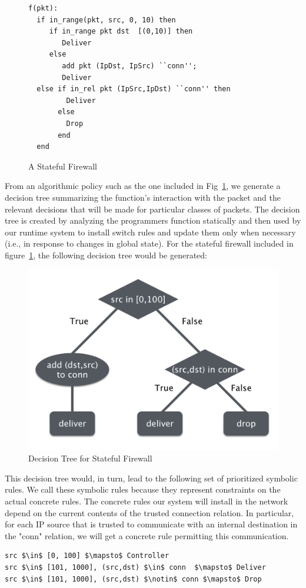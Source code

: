\documentclass[preprint]{sigplanconf}
\begin{document}
\begin{figure}[ht]
\begin{lstlisting}
f(pkt):
  if in_range(pkt, src, 0, 10) then
     if in_range pkt dst  [(0,10)] then
        Deliver
     else 
        add pkt (IpDst, IpSrc) ``conn'';
        Deliver
  else if in_rel pkt (IpSrc,IpDst) ``conn'' then
         Deliver
       else
         Drop
       end
  end                
  \end{lstlisting}

\caption{A Stateful Firewall}
\label{fig:firewallcode}
\end{figure}

From an algorithmic policy such as the one included in Fig~\ref{fig:firewallcode}, we generate a decision tree summarizing the function's interaction with the packet and the relevant decisions that will be made for particular classes of packets. The decision tree is created by analyzing the programmers function statically and then used by our runtime system to install switch rules and update them only when necessary (i.e., in response to changes in global state). For the stateful firewall included in figure~\ref{fig:firewallcode}, the following decision tree would be generated:


\begin{figure}[ht]
\includegraphics[scale=.5]{img/dtree.png}
\caption{Decision Tree for Stateful Firewall}     
\label{fig:decisiontree}  
  \end{figure}

This decision tree would, in turn, lead to the following set of prioritized symbolic rules. We call these symbolic rules because they represent constraints on the actual concrete rules. The concrete rules our system will install in the network depend on the current contents of the trusted connection relation. In particular, for each IP source that is trusted to communicate with an internal destination in the "conn" relation, we will get a concrete rule permitting this communication.
  \begin{lstlisting}[mathescape]
src $\in$ [0, 100] $\mapsto$ Controller
src $\in$ [101, 1000], (src,dst) $\in$ conn  $\mapsto$ Deliver
src $\in$ [101, 1000], (src,dst) $\notin$ conn $\mapsto$ Drop
  \end{lstlisting}
\end{document}
